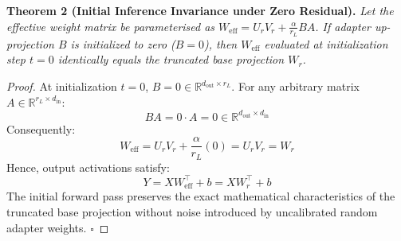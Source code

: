 \textbf{Theorem 2 (Initial Inference Invariance under Zero Residual).} \textit{Let the effective weight matrix be parameterised as $W_{\text{eff}} = U_r V_r + \frac{\alpha}{r_L} B A$. If adapter up-projection $B$ is initialized to zero ($B = 0$), then $W_{\text{eff}}$ evaluated at initialization step $t=0$ identically equals the truncated base projection $W_r$.}

\begin{proof}
At initialization $t=0$, $B = 0 \in \mathbb{R}^{d_{\text{out}} \times r_L}$. For any arbitrary matrix $A \in \mathbb{R}^{r_L \times d_{\text{in}}}$:
\[
B A = 0 \cdot A = 0 \in \mathbb{R}^{d_{\text{out}} \times d_{\text{in}}}
\]
Consequently:
\[
W_{\text{eff}} = U_r V_r + \frac{\alpha}{r_L} (0) = U_r V_r = W_r
\]
Hence, output activations satisfy:
\[
Y = X W_{\text{eff}}^\top + b = X W_r^\top + b
\]
The initial forward pass preserves the exact mathematical characteristics of the truncated base projection without noise introduced by uncalibrated random adapter weights. $\square$
\end{proof}
